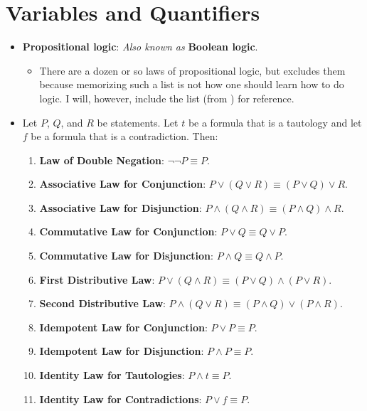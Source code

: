 \documentclass[../main.tex]{subfiles}
\begin{document}
\section{Variables and Quantifiers}
\begin{itemize}
    \item \textbf{Propositional logic}:  \emph{Also known as} \textbf{Boolean logic}.
    \begin{itemize}
        \item There are a dozen or so laws of propositional logic, but \cite{bib:AnalysisI} excludes them because memorizing such a list is not how one should learn how to do logic. I will, however, include the list (from \cite{bib:PropositionalLogicLaws}) for reference.
    \end{itemize}
    \item Let $P$, $Q$, and $R$ be statements. Let $t$ be a formula that is a tautology and let $f$ be a formula that is a contradiction. Then:
    \begin{enumerate}
        \item \textbf{Law of Double Negation}: $\neg\neg P\equiv P$.
        \item \textbf{Associative Law for Conjunction}: $P\vee(Q\vee R)\equiv (P\vee Q)\vee R$.
        \item \textbf{Associative Law for Disjunction}: $P\wedge(Q\wedge R)\equiv(P\wedge Q)\wedge R$.
        \item \textbf{Commutative Law for Conjunction}: $P\vee Q\equiv Q\vee P$.
        \item \textbf{Commutative Law for Disjunction}: $P\wedge Q\equiv Q\wedge P$.
        \item \textbf{First Distributive Law}: $P\vee(Q\wedge R)\equiv(P\vee Q)\wedge(P\vee R)$.
        \item \textbf{Second Distributive Law}: $P\wedge(Q\vee R)\equiv(P\wedge Q)\vee(P\wedge R)$.
        \item \textbf{Idempotent Law for Conjunction}: $P\vee P\equiv P$.
        \item \textbf{Idempotent Law for Disjunction}: $P\wedge P\equiv P$.
        \item \textbf{Identity Law for Tautologies}: $P\wedge t\equiv P$.
        \item \textbf{Identity Law for Contradictions}: $P\vee f\equiv P$.

\end{enumerate}
\end{itemize}
\end{document}
